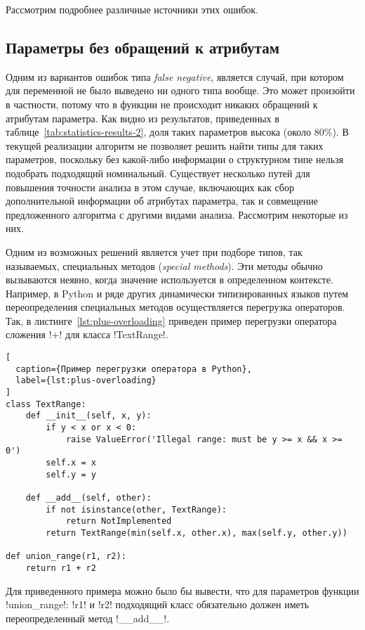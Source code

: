 Рассмотрим подробнее различные источники этих ошибок.

\subsection{Параметры без обращений к атрибутам}
\label{sub:attributeless-parameters}

Одним из вариантов ошибок типа \emph{false negative}, является случай, при
котором для переменной не было выведено ни одного типа вообще. Это может
произойти в частности, потому что в функции не происходит никаких обращений к
атрибутам параметра. Как видно из результатов, приведенных в
таблице~\ref{tab:statistics-results-2}, доля таких параметров высока (около
80\%). В текущей реализации алгоритм не позволяет решить найти типы для таких
параметров, поскольку без какой-либо информации о структурном типе нельзя
подобрать подходящий номинальный. Существует несколько путей для повышения
точности анализа в этом случае, включающих как сбор дополнительной информации об
атрибутах параметра, так и совмещение предложенного алгоритма с другими видами
анализа. Рассмотрим некоторые из них.

Одним из возможных решений является учет при подборе типов, так называемых,
специальных методов (\emph{special methods}). Эти методы обычно вызываются
неявно, когда значение используется в определенном контексте. Например, в
Python и ряде других динамически типизированных языков путем переопределения
специальных методов осуществляется перегрузка операторов.  Так, в
листинге~\ref{lst:plus-overloading} приведен пример перегрузки оператора
сложения !+! для класса !TextRange!.

\begin{lstlisting}[
  caption={Пример перегрузки оператора в Python},
  label={lst:plus-overloading}
]
сlass TextRange:
    def __init__(self, x, y):
        if y < x or x < 0:
            raise ValueError('Illegal range: must be y >= x && x >= 0')
        self.x = x
        self.y = y

    def __add__(self, other):
        if not isinstance(other, TextRange):
            return NotImplemented
        return TextRange(min(self.x, other.x), max(self.y, other.y))

def union_range(r1, r2):
    return r1 + r2    

\end{lstlisting}

Для приведенного примера можно было бы вывести, что для параметров функции
!union_range!: !r1! и !r2! подходящий класс обязательно должен иметь
переопределенный метод !__add__!. 

